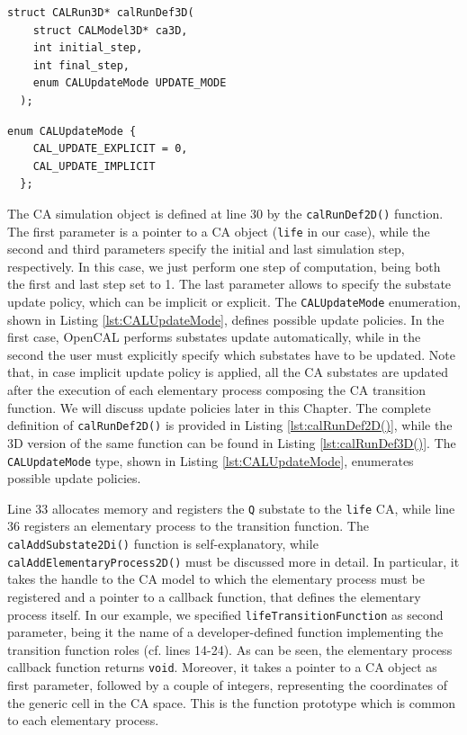\begin{lstlisting}[float, label=lst:calRunDef3D(), caption=Definition of the calRunDef3D() function., numbers=none]
  struct CALRun3D* calRunDef3D(
    struct CALModel3D* ca3D,
    int initial_step,
    int final_step,
    enum CALUpdateMode UPDATE_MODE
  );	
\end{lstlisting}

\begin{lstlisting}[float, label=lst:CALUpdateMode, caption=The CALUpdateMode enum type., numbers=none]
  enum CALUpdateMode {
    CAL_UPDATE_EXPLICIT = 0,
    CAL_UPDATE_IMPLICIT
  };
\end{lstlisting}


The CA simulation object is defined at line 30 by the
\verb'calRunDef2D()' function. The first parameter is a pointer to a
CA object (\verb'life' in our case), while the second and third
parameters specify the initial and last simulation step,
respectively. In this case, we just perform one step of computation,
being both the first and last step set to 1. The last parameter allows
to specify the substate update policy, which can be implicit or
explicit. The \verb'CALUpdateMode' enumeration, shown in Listing
\ref{lst:CALUpdateMode}, defines possible update policies. In the
first case, OpenCAL performs substates update automatically, while in
the second the user must explicitly specify which substates have to be
updated. Note that, in case implicit update policy is applied, all the
CA substates are updated after the execution of each elementary
process composing the CA transition function. We will discuss update
policies later in this Chapter. The complete definition of
\verb'calRunDef2D()' is provided in Listing \ref{lst:calRunDef2D()},
while the 3D version of the same function can be found in Listing
\ref{lst:calRunDef3D()}. The \verb'CALUpdateMode' type, shown in
Listing \ref{lst:CALUpdateMode}, enumerates possible update policies.


Line 33 allocates memory and registers the \verb'Q' substate to the
\verb'life' CA, while line 36 registers an elementary process to the
transition function. The \verb'calAddSubstate2Di()' function is
self-explanatory, while \verb'calAddElementaryProcess2D()' must be
discussed more in detail. In particular, it takes the handle to the CA
model to which the elementary process must be registered and a pointer
to a callback function, that defines the elementary process itself. In
our example, we specified \verb'lifeTransitionFunction' as second
parameter, being it the name of a developer-defined function
implementing the transition function roles (cf. lines 14-24). As can
be seen, the elementary process callback function returns
\verb'void'. Moreover, it takes a pointer to a CA object as first
parameter, followed by a couple of integers, representing the
coordinates of the generic cell in the CA space. This is the function
prototype which is common to each elementary process.

